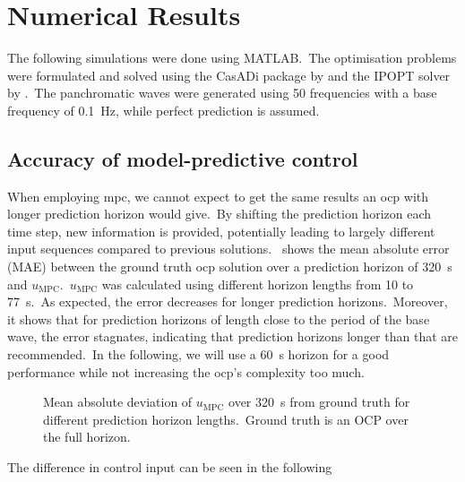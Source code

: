 \section{Numerical Results}

The following simulations were done using MATLAB.\ 
The optimisation problems were formulated and solved using the CasADi package by \cite{Andersson2019casadi} and the IPOPT solver by \cite{Waechter2006ipopt}.\
The panchromatic waves were generated using 50 frequencies with a base frequency of \SI{0.1}{\hertz}, while perfect prediction is assumed.\ 

\subsection{Accuracy of model-predictive control}
\label{sec:accuracy}
When employing \ac{mpc}, we cannot expect to get the same results an \ac{ocp} with longer prediction horizon would give.\ 
By shifting the prediction horizon each time step, new information is provided, potentially leading to largely different input sequences compared to previous solutions.\
 shows the mean absolute error (MAE) between the ground truth \ac{ocp} solution over a prediction horizon of \SI{320}{\second} and $u_\mathrm{MPC}$.\ 
$u_\mathrm{MPC}$ was calculated using different horizon lengths from 10 to \SI{77}{\second}.\
As expected, the error decreases for longer prediction horizons.\ 
Moreover, it shows that for prediction horizons of length close to the period of the base wave, the error stagnates, indicating that prediction horizons longer than that are recommended.\ 
In the following, we will use a \SI{60}{\second} horizon for a good performance while not increasing the \ac{ocp}'s complexity too much.
\begin{figure}[htb]
	\centering
	\fontsize{8}{0}\selectfont
	\def\svgwidth{0.47\textwidth}
	
	\caption{Mean absolute deviation of $u_\mathrm{MPC}$ over \SI{320}{\second} from ground truth for different prediction horizon lengths.\ Ground truth is an OCP over the full horizon.}
	\label{fig:mpc_error}
\end{figure}

The difference in control input can be seen in the following 

